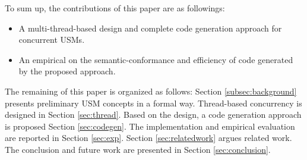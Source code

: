 
To sum up, the contributions of this paper are as followings:
\begin{itemize}
	\item A multi-thread-based design and complete code generation approach for concurrent USMs.
	\item An empirical on the semantic-conformance and efficiency of code generated by the proposed approach.  
\end{itemize}

The remaining of this paper is organized as follows: Section \ref{subsec:background} presents preliminary USM concepts in a formal way. Thread-based concurrency is designed in Section \ref{sec:thread}. Based on the design, a code generation approach is proposed Section \ref{sec:codegen}. The implementation and empirical evaluation are reported in Section \ref{sec:exp}. Section \ref{sec:relatedwork} argues related work. The conclusion and future work are presented in Section \ref{sec:conclusion}.